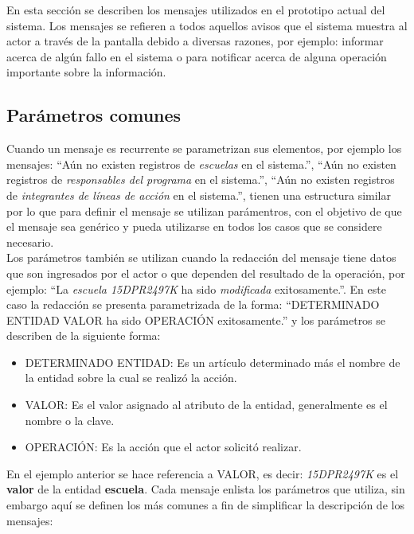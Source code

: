 	En esta sección se describen los mensajes utilizados en el prototipo actual del sistema. Los mensajes se refieren a todos
	aquellos avisos que el sistema muestra al actor a través de la pantalla debido a diversas
	razones, por ejemplo: informar acerca de algún fallo en el sistema o para notificar acerca de alguna operación importante sobre
	la información.

\subsection{Parámetros comunes}
    Cuando un mensaje es recurrente se parametrizan sus elementos, por ejemplo los mensajes: ``Aún no existen registros de {\em escuelas} en el sistema.'', ``Aún no existen registros de {\em responsables del programa} en el sistema.'', 
    ``Aún no existen registros de {\em integrantes de líneas de acción} en el sistema.'', tienen una estructura similar 
    por lo que para definir el mensaje se utilizan parámentros, con el objetivo de que el mensaje sea genérico y  
    pueda utilizarse en todos los casos que se considere necesario.\\
    
    Los parámetros también se utilizan cuando la redacción del mensaje tiene datos que son ingresados por el actor o que dependen del resultado de la operación, por ejemplo: 
    ``La {\em escuela  15DPR2497K} ha sido {\em modificada} exitosamente.''. En este caso la redacción se presenta parametrizada de la forma: ``DETERMINADO ENTIDAD VALOR ha sido OPERACIÓN exitosamente.'' y los 
    parámetros se describen de la siguiente forma:
    
    \begin{itemize}
	\item DETERMINADO ENTIDAD: Es un artículo determinado más el nombre de la entidad sobre la cual se realizó la acción.
	\item VALOR: Es el valor asignado al atributo de la entidad, generalmente es el nombre o la clave.
	\item OPERACIÓN: Es la acción que el actor solicitó realizar.
    \end{itemize}

    En el ejemplo anterior se hace referencia a VALOR, es decir: {\em 15DPR2497K} es el {\bf valor}  de la entidad {\bf escuela}. Cada mensaje enlista los parámetros 
    que utiliza, sin embargo aquí se definen los más comunes a fin de simplificar la descripción de los mensajes:

